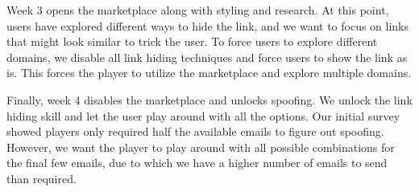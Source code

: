 Week 3 opens the marketplace along with styling and research. At this point, users have explored different ways to hide the link, and we want to focus on links that might look similar to trick the user. To force users to explore different domains, we disable all link hiding techniques and force users to show the link as is. This forces the player to utilize the marketplace and explore multiple domains.

Finally, week 4 disables the marketplace and unlocks spoofing. We unlock the link hiding skill and let the user play around with all the options. Our initial survey showed players only required half the available emails to figure out spoofing. However, we want the player to play around with all possible combinations for the final few emails, due to which we have a higher number of emails to send than required.